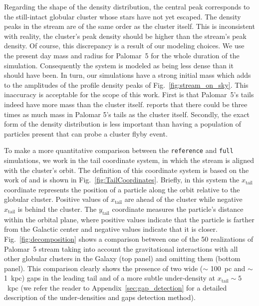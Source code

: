 \documentclass{aa}
\begin{document}
    Regarding the shape of the density distribution, the central peak corresponds to the still-intact globular cluster whose stars have not yet escaped. The density peaks in the stream are of the same order as the cluster itself. This is inconsistent with reality, the cluster's peak density should be higher than the stream's peak density. Of course, this discrepancy is a result of our modeling choices. We use the present day mass and radius for Palomar~5 for the whole duration of the simulation. Consequently the system is modeled as being less dense than it should have been. In turn, our simulations have a strong initial mass which adds to the amplitudes of the profile density peaks of Fig.~\ref{fig:stream_on_sky}. This inaccuracy is acceptable for the scope of this work. First is that Palomar~5's tails indeed have more mass than the cluster itself. \citet{2017ApJ...842..120I} reports that there could be three times as much mass in Palomar 5's tails as the cluster itself. Secondly, the exact form of the density distribution is less important than having a population of particles present that can probe a cluster flyby event.
    
    To make a more quantitative comparison between the \texttt{reference} and \texttt{full} simulations, we work in the tail coordinate system, in which the stream is aligned with the cluster's orbit. The definition of this coordinate system is based on the work of \citet{2004AJ....127.2753D} and is shown in Fig.~\ref{fig:TailCoordinates}. Briefly, in this system the $x_{\textrm{tail}}$ coordinate represents the position of a particle along the orbit relative to the globular cluster. Positive values of $x_{\textrm{tail}}$ are ahead of the cluster while negative $x_{\textrm{tail}}$ is behind the cluster. The $y_{\textrm{tail}}$ coordinate measures the particle's distance within the orbital plane, where positive values indicate that the particle is farther from the Galactic center and negative values indicate that it is closer. Fig.~\ref{fig:decomposition} shows a comparison between one of the 50 realizations of Palomar~5 stream taking into account the gravitational interactions with all other globular clusters in the Galaxy (top panel) and omitting them (bottom panel). This comparison clearly shows the presence of two wide ($\sim$ 100~pc and $\sim$ 1~kpc) gaps in the leading tail and of a more subtle under-density at $x_{\textrm{tail}}\sim 5$~kpc (we refer the reader to Appendix~\ref{sec:gap_detection} for a detailed description of the under-densities and gaps detection method). 
    
\end{document}
